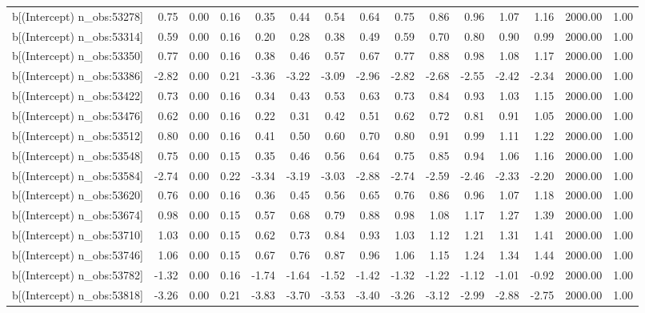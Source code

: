 \begin{table}[ht]
\begin{tabular}{rrrrrrrrrrrrrrr}
  b[(Intercept) n\_obs:53278] & 0.75 & 0.00 & 0.16 & 0.35 & 0.44 & 0.54 & 0.64 & 0.75 & 0.86 & 0.96 & 1.07 & 1.16 & 2000.00 & 1.00 \\ 
  b[(Intercept) n\_obs:53314] & 0.59 & 0.00 & 0.16 & 0.20 & 0.28 & 0.38 & 0.49 & 0.59 & 0.70 & 0.80 & 0.90 & 0.99 & 2000.00 & 1.00 \\ 
  b[(Intercept) n\_obs:53350] & 0.77 & 0.00 & 0.16 & 0.38 & 0.46 & 0.57 & 0.67 & 0.77 & 0.88 & 0.98 & 1.08 & 1.17 & 2000.00 & 1.00 \\ 
  b[(Intercept) n\_obs:53386] & -2.82 & 0.00 & 0.21 & -3.36 & -3.22 & -3.09 & -2.96 & -2.82 & -2.68 & -2.55 & -2.42 & -2.34 & 2000.00 & 1.00 \\ 
  b[(Intercept) n\_obs:53422] & 0.73 & 0.00 & 0.16 & 0.34 & 0.43 & 0.53 & 0.63 & 0.73 & 0.84 & 0.93 & 1.03 & 1.15 & 2000.00 & 1.00 \\ 
  b[(Intercept) n\_obs:53476] & 0.62 & 0.00 & 0.16 & 0.22 & 0.31 & 0.42 & 0.51 & 0.62 & 0.72 & 0.81 & 0.91 & 1.05 & 2000.00 & 1.00 \\ 
  b[(Intercept) n\_obs:53512] & 0.80 & 0.00 & 0.16 & 0.41 & 0.50 & 0.60 & 0.70 & 0.80 & 0.91 & 0.99 & 1.11 & 1.22 & 2000.00 & 1.00 \\ 
  b[(Intercept) n\_obs:53548] & 0.75 & 0.00 & 0.15 & 0.35 & 0.46 & 0.56 & 0.64 & 0.75 & 0.85 & 0.94 & 1.06 & 1.16 & 2000.00 & 1.00 \\ 
  b[(Intercept) n\_obs:53584] & -2.74 & 0.00 & 0.22 & -3.34 & -3.19 & -3.03 & -2.88 & -2.74 & -2.59 & -2.46 & -2.33 & -2.20 & 2000.00 & 1.00 \\ 
  b[(Intercept) n\_obs:53620] & 0.76 & 0.00 & 0.16 & 0.36 & 0.45 & 0.56 & 0.65 & 0.76 & 0.86 & 0.96 & 1.07 & 1.18 & 2000.00 & 1.00 \\ 
  b[(Intercept) n\_obs:53674] & 0.98 & 0.00 & 0.15 & 0.57 & 0.68 & 0.79 & 0.88 & 0.98 & 1.08 & 1.17 & 1.27 & 1.39 & 2000.00 & 1.00 \\ 
  b[(Intercept) n\_obs:53710] & 1.03 & 0.00 & 0.15 & 0.62 & 0.73 & 0.84 & 0.93 & 1.03 & 1.12 & 1.21 & 1.31 & 1.41 & 2000.00 & 1.00 \\ 
  b[(Intercept) n\_obs:53746] & 1.06 & 0.00 & 0.15 & 0.67 & 0.76 & 0.87 & 0.96 & 1.06 & 1.15 & 1.24 & 1.34 & 1.44 & 2000.00 & 1.00 \\ 
  b[(Intercept) n\_obs:53782] & -1.32 & 0.00 & 0.16 & -1.74 & -1.64 & -1.52 & -1.42 & -1.32 & -1.22 & -1.12 & -1.01 & -0.92 & 2000.00 & 1.00 \\ 
  b[(Intercept) n\_obs:53818] & -3.26 & 0.00 & 0.21 & -3.83 & -3.70 & -3.53 & -3.40 & -3.26 & -3.12 & -2.99 & -2.88 & -2.75 & 2000.00 & 1.00 \\ 

\end{tabular}
\end{table}
